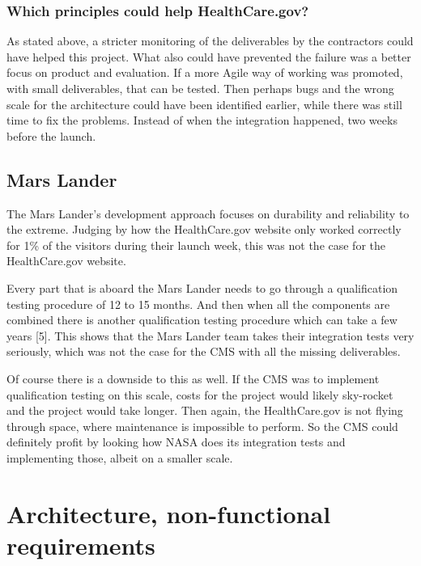 \documentclass[]{article}
\begin{document}
\subsubsection{Which principles could help
HealthCare.gov?}\label{which-principles-could-help-healthcare.gov-1}

As stated above, a stricter monitoring of the deliverables by the
contractors could have helped this project. What also could have
prevented the failure was a better focus on product and evaluation. If a
more Agile way of working was promoted, with small deliverables, that
can be tested. Then perhaps bugs and the wrong scale for the
architecture could have been identified earlier, while there was still
time to fix the problems. Instead of when the integration happened, two
weeks before the launch.

\subsection{Mars Lander}\label{mars-lander}

The Mars Lander's development approach focuses on durability and
reliability to the extreme. Judging by how the HealthCare.gov website
only worked correctly for 1\% of the visitors during their launch week,
this was not the case for the HealthCare.gov website.

Every part that is aboard the Mars Lander needs to go through a
qualification testing procedure of 12 to 15 months. And then when all
the components are combined there is another qualification testing
procedure which can take a few years {[}5{]}. This shows that the Mars
Lander team takes their integration tests very seriously, which was not
the case for the CMS with all the missing deliverables.

Of course there is a downside to this as well. If the CMS was to
implement qualification testing on this scale, costs for the project
would likely sky-rocket and the project would take longer. Then again,
the HealthCare.gov is not flying through space, where maintenance is
impossible to perform. So the CMS could definitely profit by looking how
NASA does its integration tests and implementing those, albeit on a
smaller scale.

\section{Architecture, non-functional
requirements}\label{architecture-non-functional-requirements}
\end{document}

